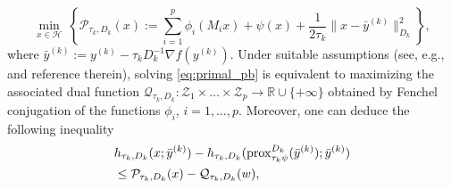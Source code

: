 \documentclass[conference]{IEEEtran}
\begin{document}
\small{
\begin{equation}  \label{eq:primal_pb}
   \min_{x\in \mathcal{H}}~ \left\{ \mathcal{P}_{\tau_{k},D_{k}}(x) := \sum_{i=1}^p \phi_i (M_ix) + \psi(x) + \frac{1}{2\tau_{k}} \|x- \bar{y}^{(k)} \|^2_{D_{k}} \right\},
\end{equation}}
\normalsize
where $\bar{y}^{(k)}:=y^{(k)}-\tau_{k} D_{k}^{-1}\nabla f (y^{(k)})$. Under suitable assumptions (see, e.g., \cite[Section 4.1]{Bonettini2018a} and reference therein), solving \eqref{eq:primal_pb} is equivalent to maximizing the associated dual function $ \mathcal{Q}_{\tau_{k},D_{k}}:\mathcal{Z}_1\times\ldots\times \mathcal{Z}_p\rightarrow \mathbb{R}\cup\{+\infty\}$ obtained by Fenchel conjugation of the functions $\phi_i$, $i=1,\ldots,p$. Moreover, one can deduce the following inequality
\begin{align*}
& h_{\tau_k,D_k}(x;\bar{y}^{(k)})-h_{\tau_k,D_k}(\mathrm{prox}_{\tau_{k}\psi}^{D_{k}} (\bar{y}^{(k)});\bar{y}^{(k)}) \\
& \leq   \mathcal{P}_{\tau_{k},D_{k}}(x) - \mathcal{Q}_{\tau_{k},D_{k}}(w), 
\end{align*}
\end{document}
